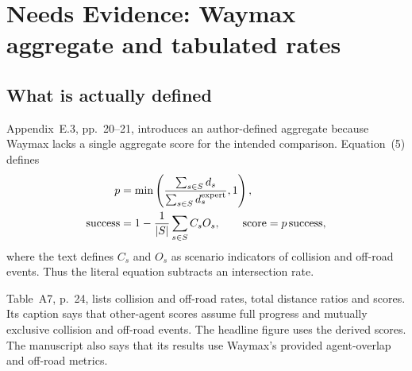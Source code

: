 \documentclass[10pt]{article}
\begin{document}
\section*{Needs Evidence: Waymax aggregate and tabulated rates}
\subsection*{What is actually defined}
Appendix E.3, pp. 20–21, introduces an author-defined aggregate because Waymax lacks a single aggregate score for the intended comparison. Equation (5) defines \[\begin{aligned}
 p&=\min\left(\frac{\sum_{s\in S}d_s}
                    {\sum_{s\in S}d_s^{\rm expert}},1\right),\\
 {\rm success}&=1-\frac1{|S|}\sum_{s\in S}C_sO_s,\qquad
 {\rm score}=p\,{\rm success},\end{aligned}\] where the text defines \(C_s\) and \(O_s\) as scenario indicators of collision and off-road events. Thus the literal equation subtracts an intersection rate.\par
Table A7, p. 24, lists collision and off-road rates, total distance ratios and scores. Its caption says that other-agent scores assume full progress and mutually exclusive collision and off-road events. The headline figure uses the derived scores. The manuscript also says that its results use Waymax’s provided agent-overlap and off-road metrics.\par
\end{document}
